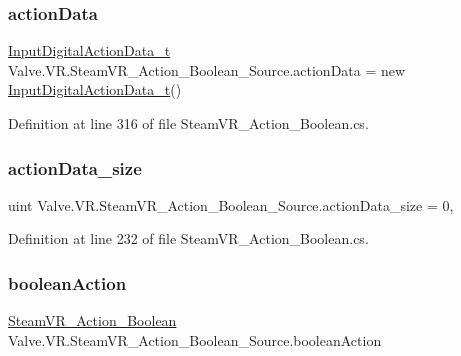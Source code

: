 \subsubsection{\texorpdfstring{actionData}{actionData}}
{\footnotesize\ttfamily \mbox{\hyperlink{struct_valve_1_1_v_r_1_1_input_digital_action_data__t}{Input\+Digital\+Action\+Data\+\_\+t}} Valve.\+V\+R.\+Steam\+V\+R\+\_\+\+Action\+\_\+\+Boolean\+\_\+\+Source.\+action\+Data = new \mbox{\hyperlink{struct_valve_1_1_v_r_1_1_input_digital_action_data__t}{Input\+Digital\+Action\+Data\+\_\+t}}()\hspace{0.3cm}{\ttfamily [protected]}}



Definition at line 316 of file Steam\+V\+R\+\_\+\+Action\+\_\+\+Boolean.\+cs.

\mbox{\label{class_valve_1_1_v_r_1_1_steam_v_r___action___boolean___source_ab45da73ac3ff33090639d347dbbe12bf}} 
\subsubsection{\texorpdfstring{actionData\_size}{actionData\_size}}
{\footnotesize\ttfamily uint Valve.\+V\+R.\+Steam\+V\+R\+\_\+\+Action\+\_\+\+Boolean\+\_\+\+Source.\+action\+Data\+\_\+size = 0\hspace{0.3cm}{\ttfamily [static]}, {\ttfamily [protected]}}



Definition at line 232 of file Steam\+V\+R\+\_\+\+Action\+\_\+\+Boolean.\+cs.

\mbox{\label{class_valve_1_1_v_r_1_1_steam_v_r___action___boolean___source_ab06d75d32615dfe0b2028e3e3b4d978d}} 
\subsubsection{\texorpdfstring{booleanAction}{booleanAction}}
{\footnotesize\ttfamily \mbox{\hyperlink{class_valve_1_1_v_r_1_1_steam_v_r___action___boolean}{Steam\+V\+R\+\_\+\+Action\+\_\+\+Boolean}} Valve.\+V\+R.\+Steam\+V\+R\+\_\+\+Action\+\_\+\+Boolean\+\_\+\+Source.\+boolean\+Action\hspace{0.3cm}{\ttfamily [protected]}}



